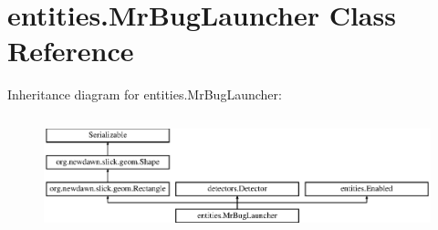 \hypertarget{classentities_1_1_mr_bug_launcher}{}\section{entities.\+Mr\+Bug\+Launcher Class Reference}
\label{classentities_1_1_mr_bug_launcher}
Inheritance diagram for entities.\+Mr\+Bug\+Launcher\+:\begin{figure}[H]
\begin{center}
\leavevmode
\includegraphics[height=3.409437cm]{classentities_1_1_mr_bug_launcher}
\end{center}
\end{figure}
